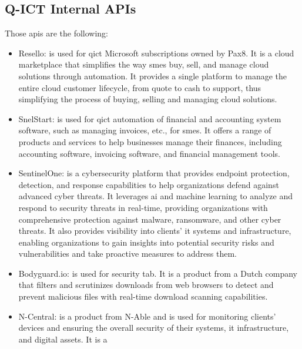 \begin{multicols}{2}
      \subsection{Q-ICT Internal APIs}
      Those \acrshort{api}s are the following:
      \begin{itemize}
            \item Resello: is used for \acrshort{qict} Microsoft subscriptions owned by Pax8. It is a cloud
                  marketplace that simplifies the way \acrshort{sme}s buy, sell, and manage cloud solutions through
                  automation. It provides a single platform to manage the entire cloud customer lifecycle, from
                  quote to cash to support, thus simplifying the process of buying, selling and managing cloud
                  solutions.
            \item SnelStart: is used for \acrshort{qict} automation of financial and accounting system software,
                  such as managing invoices, etc., for \acrshort{sme}s. It offers a range of products and services
                  to help businesses manage their finances, including accounting software, invoicing software, and
                  financial management tools.
            \item SentinelOne: is a cybersecurity platform that provides endpoint protection, detection, and
                  response capabilities to help organizations defend against advanced cyber threats. It leverages
                  \acrlong{ai} and machine learning to analyze and respond to security threats in real-time,
                  providing organizations with comprehensive protection against malware, ransomware, and other
                  cyber threats. It also provides visibility into clients' \acrshort{it} systems and infrastructure,
                  enabling organizations to gain insights into potential security risks and vulnerabilities and take
                  proactive measures to address them.
            \item Bodyguard.io: is used for security tab. It is a product from a Dutch company that filters and
                  scrutinizes downloads from web browsers to detect and prevent malicious files with real-time
                  download scanning capabilities.
            \item N-Central: is a product from N-Able and is used for monitoring clients' devices and ensuring the
                  overall security of their systems, \acrshort{it} infrastructure, and digital assets. It is a

\end{itemize}
\end{multicols}
